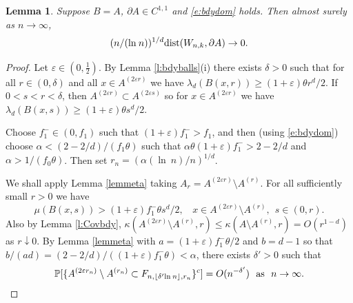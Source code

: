 \documentclass[12pt]{article}
\renewcommand{\Pr}{\mathbb{P}}
\newcommand{\eps}{\varepsilon}
\newcommand{\dist}{{\rm dist}}
\renewcommand{\log}{{\ln \:}}
\newtheorem{lemm}{Lemma}
\begin{document}
\begin{lemm}
	\label{l:Wtobdy}
	Suppose $B=A$, $\partial A \in C^{1,1}$
	and \eqref{e:bdydom} holds. Then almost surely as $n \to \infty$,
	$$
	(n/(\log n))^{1/d}
	\dist(W_{n,k},\partial A) \to 0.
	$$
\end{lemm}
\begin{proof}
	Let $\eps \in (0,\frac12)$. By Lemma \ref{l:bdyballs}(i)
	there exists $\delta >0$
	such that for all $r \in (0,\delta)$
	and all $x \in A^{(2 \eps r)}$
	we have $\lambda_d(B(x,r)) \geq (1+\eps) \theta r^d/2$.
	If $0 < s < r < \delta$, then $A^{(2 \eps r)} \subset A^{(2 \eps s)}$
	so for $x \in A^{(2 \eps r)}$ we have
	$\lambda_d(B(x,s)) \geq (1+\eps) \theta s^d/2$.



	Choose $f_1^- \in (0,f_1)$ such that $(1+ \eps) f_1^- > f_1$,
	and then (using \eqref{e:bdydom})
	choose $\alpha < (2-2/d)/(f_1 \theta)$ such that
	$\alpha \theta (1+ \eps) f_1^- > 2- 2/d$
	and $\alpha > 1/(f_0 \theta)$. Then set 
	$r_n = (\alpha (\log n)/n)^{1/d}$.

	We shall apply Lemma \ref{lemmeta} taking 
	 $A_r = A^{(2 \eps r)} \setminus A^{(r)}$. 
	For all  sufficiently small $r >0$  we have
	$$
	\mu(B(x,s)) > (1+ \eps) f_1^- \theta s^d/2,  ~~~~ x \in
	 A^{(2 \eps r)} \setminus A^{(r)}, ~~s \in (0,r).  
	$$
	Also by Lemma \ref{l:Covbdy}, 
	$\kappa (A^{(2 \eps r)} \setminus A^{(r)},r)
	\leq \kappa(A \setminus A^{(r)},r) 
	= O(r^{1-d})$
	as $r \downarrow 0$.  By Lemma \ref{lemmeta} with
	$a= (1+ \eps) f_1^- \theta/2$
	and $b=d-1$  so that $b/(ad) = (2-2/d) / ((1+\eps) f_1^- \theta)
	< \alpha$, there exists $\delta' >0$
	such that
	\begin{align}
		\Pr[ \{ A^{(2 \eps r_n)} \setminus A^{(r_n)}
	\subset F_{n,\lfloor \delta' \log n \rfloor, r_n} \}^c]
	= O (n^{-\delta'}) ~~ {\rm as}~~ n \to \infty.
		\label{e:covshell}
	\end{align}


\end{proof}
\end{document}
